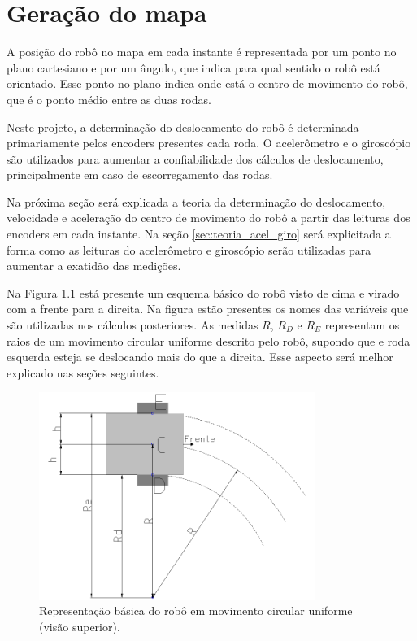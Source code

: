 \chapter{Geração do mapa}

A posição do robô no mapa em cada instante é representada por um ponto no plano cartesiano e por um ângulo, que indica para qual sentido o robô está orientado. Esse ponto no plano indica onde está o centro de movimento do robô, que é o ponto médio entre as duas rodas.

Neste projeto, a determinação do deslocamento do robô é determinada primariamente pelos encoders presentes cada roda. O acelerômetro e o giroscópio são utilizados para aumentar a confiabilidade dos cálculos de deslocamento, principalmente em caso de escorregamento das rodas.

Na próxima seção será explicada a teoria da determinação do deslocamento, velocidade e aceleração do centro de movimento do robô a partir das leituras dos encoders em cada instante. Na seção \ref{sec:teoria_acel_giro} será explicitada a forma como as leituras do acelerômetro e giroscópio serão utilizadas para aumentar a exatidão das medições.

Na Figura \ref{fig:robo} está presente um esquema básico do robô visto de cima e virado com a frente para a direita. Na figura estão presentes os nomes das variáveis que são utilizadas nos cálculos posteriores. As medidas $R$, $R_D$ e $R_E$ representam os raios de um movimento circular uniforme descrito pelo robô, supondo que e roda esquerda esteja se deslocando mais do que a direita. Esse aspecto será melhor explicado nas seções seguintes. 

\begin{figure}[H]
  \centering
  \includegraphics[width=0.8\textwidth, keepaspectratio]{./figuras/robo/robo.png}
  \caption{Representação básica do robô em movimento circular uniforme (visão superior).}
  \label{fig:robo}
\end{figure}

